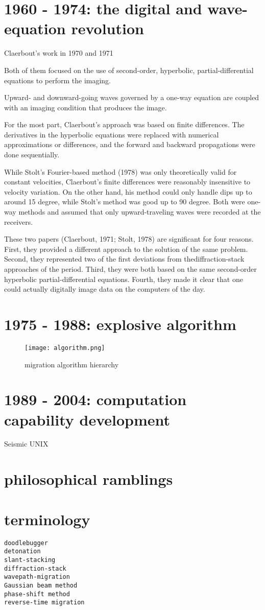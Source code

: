 \documentclass{article}
\begin{document}
\section{1960 - 1974: the digital and wave-equation revolution}
Claerbout's work in 1970 and 1971\par
Both of them focused on the use of second-order, hyperbolic, partial-differential equations to perform the imaging.\par
Upward- and downward-going waves governed by a one-way equation are coupled with an imaging condition that produces the image.\par
For the most part, Claerbout’s approach was based on finite differences. The derivatives in the hyperbolic equations were replaced with numerical approximations or differences, and the forward and backward propagations were done sequentially.\par
While Stolt’s Fourier-based method (1978) was only theoretically valid for constant velocities, Claerbout’s finite differences were reasonably insensitive to velocity variation. On the other hand, his method could only handle dips up to around 15 degree, while Stolt’s method was good up to 90 degree. Both were one-way methods and assumed that only upward-traveling waves were recorded at the receivers.\par
These two papers (Claerbout, 1971; Stolt, 1978) are significant for four reasons. First, they provided a different approach to the solution of the same problem. Second, they represented two of the first deviations from thediffraction-stack approaches of the period. Third, they were both based on the same second-order hyperbolic partial-differential equations. Fourth, they made it clear that one could actually digitally image data on the computers of the day.\par
\section{1975 - 1988: explosive algorithm}
\begin{figure}[H]
\centering
\texttt{[image: algorithm.png]}
\caption{migration algorithm hierarchy}
\end{figure}
\section{1989 - 2004: computation capability development}
Seismic UNIX\par
\section{philosophical ramblings}
\section{terminology}
\begin{lstlisting}
doodlebugger
detonation
slant-stacking
diffraction-stack
wavepath-migration
Gaussian beam method
phase-shift method
reverse-time migration
\end{lstlisting}
\end{document}

